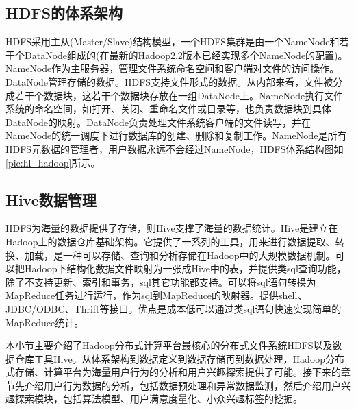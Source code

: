   \subsection{HDFS的体系架构}
  HDFS采用主从(Master/Slave)结构模型，一个HDFS集群是由一个NameNode和若干个DataNode组成的(在最新的Hadoop2.2版本已经实现多个NameNode的配置)。NameNode作为主服务器，管理文件系统命名空间和客户端对文件的访问操作。DataNode管理存储的数据。HDFS支持文件形式的数据。从内部来看，文件被分成若干个数据块，这若干个数据块存放在一组DataNode上。NameNode执行文件系统的命名空间，如打开、关闭、重命名文件或目录等，也负责数据块到具体DataNode的映射。DataNode负责处理文件系统客户端的文件读写，并在NameNode的统一调度下进行数据库的创建、删除和复制工作。NameNode是所有HDFS元数据的管理者，用户数据永远不会经过NameNode，HDFS体系结构图如\autoref{pic:hl_hadoop}所示。
  \begin{figure}
  \centering
    \label{pic:hl_hadoop}
  \end{figure}

  \subsection{Hive数据管理}
  HDFS为海量的数据提供了存储，则Hive支撑了海量的数据统计。Hive是建立在Hadoop上的数据仓库基础架构。它提供了一系列的工具，用来进行数据提取、转换、加载，是一种可以存储、查询和分析存储在Hadoop中的大规模数据机制。可以把Hadoop下结构化数据文件映射为一张成Hive中的表，并提供类sql查询功能，除了不支持更新、索引和事务，sql其它功能都支持。可以将sql语句转换为MapReduce任务进行运行，作为sql到MapReduce的映射器。提供shell、JDBC/ODBC、Thrift等接口。优点是成本低可以通过类sql语句快速实现简单的MapReduce统计。

本小节主要介绍了Hadoop分布式计算平台最核心的分布式文件系统HDFS以及数据仓库工具Hive。从体系架构到数据定义到数据存储再到数据处理，Hadoop分布式存储、计算平台为海量用户行为的分析和用户兴趣探索提供了可能。接下来的章节先介绍用户行为数据的分析，包括数据预处理和异常数据监测，然后介绍用户兴趣探索模块，包括算法模型、用户满意度量化、小众兴趣标签的挖掘。

